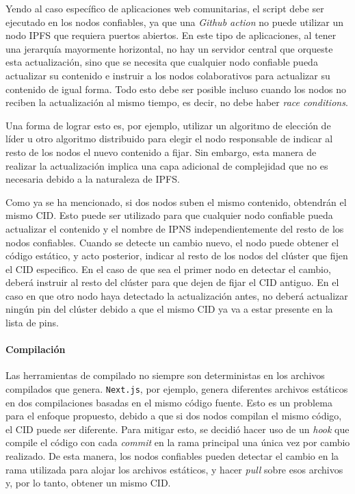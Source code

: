 Yendo al caso específico de aplicaciones web comunitarias, el script debe ser ejecutado en los nodos confiables, ya que una \textit{Github action} no puede utilizar un nodo IPFS que requiera puertos abiertos. En este tipo de aplicaciones, al tener una jerarquía mayormente horizontal, no hay un servidor central que orqueste esta actualización, sino que se necesita que cualquier nodo confiable pueda actualizar su contenido e instruir a los nodos colaborativos para actualizar su contenido de igual forma. Todo esto debe ser posible incluso cuando los nodos no reciben la actualización al mismo tiempo, es decir, no debe haber \textit{race conditions}.

Una forma de lograr esto es, por ejemplo, utilizar un algoritmo de elección de líder u otro algoritmo distribuido para elegir el nodo responsable de indicar al resto de los nodos el nuevo contenido a fijar. Sin embargo, esta manera de realizar la actualización implica una capa adicional de complejidad que no es necesaria debido a la naturaleza de IPFS.

Como ya se ha mencionado, si dos nodos suben el mismo contenido, obtendrán el mismo CID. Esto puede ser utilizado para que cualquier nodo confiable pueda actualizar el contenido y el nombre de IPNS independientemente del resto de los nodos confiables. Cuando se detecte un cambio nuevo, el nodo puede obtener el código estático, y acto posterior, indicar al resto de los nodos del clúster que fijen el CID especifico. En el caso de que sea el primer nodo en detectar el cambio, deberá instruir al resto del clúster para que dejen de fijar el CID antiguo. En el caso en que otro nodo haya detectado la actualización antes, no deberá actualizar ningún pin del clúster debido a que el mismo CID ya va a estar presente en la lista de pins.

\paragraph{Compilación}

Las herramientas de compilado no siempre son deterministas en los archivos compilados que genera. \texttt{Next.js}, por ejemplo, genera diferentes archivos estáticos en dos compilaciones basadas en el mismo código fuente. Esto es un problema para el enfoque propuesto, debido a que si dos nodos compilan el mismo código, el CID puede ser diferente. Para mitigar esto, se decidió hacer uso de un \textit{hook} que compile el código con cada \textit{commit} en la rama principal una única vez por cambio realizado. De esta manera, los nodos confiables pueden detectar el cambio en la rama utilizada para alojar los archivos estáticos, y hacer \textit{pull} sobre esos archivos y, por lo tanto, obtener un mismo CID.

